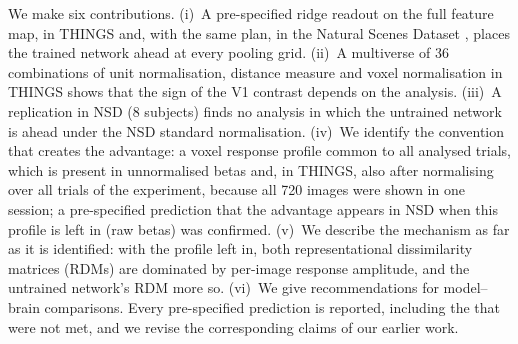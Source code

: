 We make six contributions. (i)~A pre-specified ridge readout on the full feature map, in THINGS and,
with the same plan, in the Natural Scenes Dataset \citep[NSD;][]{allen2022}, places the trained network
ahead at every pooling grid. (ii)~A multiverse of 36 combinations of unit normalisation, distance
measure and voxel normalisation in THINGS \citep{steegen2016} shows that the sign of the V1 contrast
depends on the analysis. (iii)~A replication in NSD (8 subjects) finds no analysis in which the
untrained network is ahead under the NSD standard normalisation. (iv)~We identify the convention that
creates the advantage: a voxel response profile common to all analysed trials, which is present in unnormalised betas and, in
THINGS, also after normalising over all trials of the experiment, because all 720 images were shown in
one session; a pre-specified prediction that the advantage appears in NSD when this profile is left in
(raw betas) was confirmed. (v)~We describe the
mechanism as far as it is identified: with the profile left in, both representational dissimilarity
matrices (RDMs) are dominated by per-image response amplitude, and the untrained network's RDM more so.
(vi)~We give recommendations for model--brain comparisons. Every pre-specified prediction is reported,
including the \FailedPredictions{} that were not met, and we revise the corresponding claims of our
earlier work.
